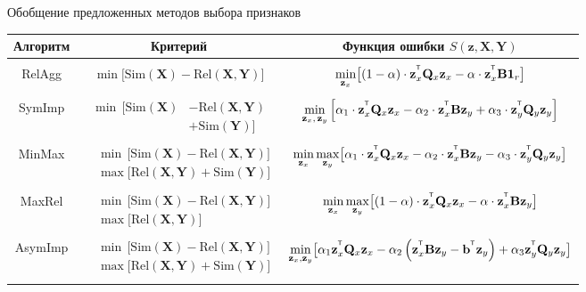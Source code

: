 \documentclass[10pt]{beamer}
\newcommand{\bb}{\mathbf{b}}
\newcommand{\bz}{\mathbf{z}}
\newcommand{\bB}{\mathbf{B}}
\newcommand{\bQ}{\mathbf{Q}}
\newcommand{\bX}{\mathbf{X}}
\newcommand{\bY}{\mathbf{Y}}
\newcommand{\T}{^{\text{\tiny\sffamily\upshape\mdseries T}}}
\newcommand{\bOne}{\boldsymbol{1}}
\begin{document}
\begin{frame}{Обобщение предложенных методов выбора признаков}
\vspace{-0.3cm}
\begin{table}
	\centering
	\footnotesize{
		\begin{tabular}{c|c|c}
			\hline
			Алгоритм & Критерий & Функция ошибки $S(\bz, \bX, \bY)$ \\
			\hline && \\ 
			RelAgg & $\min \bigl[ \text{Sim}(\bX) - \text{Rel}(\bX, \bY) \bigr] $ & $\min\limits_{\bz_x} \bigl[ (1 - \alpha) \cdot \bz_x^{\T} \bQ_x \bz_x - \alpha \cdot \bz_x^{\T} \bB \bOne_r \bigr] $ \\ &&\\
			SymImp & $\begin{aligned} \min \, \bigl[ \text{Sim}(\bX) & - \text{Rel}(\bX, \bY) \\ & + \text{Sim}(\bY) \bigr] \end{aligned}$ & $ \min\limits_{\bz_x, \, \bz_y} \left[ \alpha_1 \cdot \bz_x^{\T} \bQ_x \bz_x - \alpha_2 \cdot \bz_x^{\T} \bB \bz_y + \alpha_3 \cdot \bz_y^{\T} \bQ_y \bz_y \right] $\\ &&\\ 
			MinMax & $\begin{aligned} &\min \, \bigl[ \text{Sim}(\bX) - \text{Rel}(\bX, \bY) \bigr]  \\ & \max \bigl[\text{Rel}(\bX, \bY) + \text{Sim}(\bY) \bigr] \end{aligned}$ & $	\min\limits_{\bz_x} 	\max\limits_{\bz_y} \bigl[\alpha_1 \cdot \bz_x^{\T} \bQ_x \bz_x - \alpha_2 \cdot \bz_x^{\T} \bB \bz_y - \alpha_3 \cdot \bz_y^{\T} \bQ_y \bz_y \bigr]$ \\ &&\\ 
			MaxRel & $\begin{aligned} &\min \, \bigl[ \text{Sim}(\bX) - \text{Rel}(\bX, \bY) \bigr]  \\ & \max \bigl[\text{Rel}(\bX, \bY) \bigr] \end{aligned}$& $\min\limits_{\bz_x} 	\max\limits_{\bz_y} \bigl[ (1 - \alpha) \cdot \bz_x^{\T} \bQ_x \bz_x - \alpha \cdot \bz_x^{\T} \bB \bz_y \bigr]$ \\ 		&&\\
			AsymImp & $\begin{aligned} & \min \, \bigl[ \text{Sim}(\bX) - \text{Rel}(\bX, \bY) \bigr]\\ &  \max \bigl[\text{Rel}(\bX, \bY) + \text{Sim}(\bY) \bigr] \end{aligned}$ & $\min\limits_{\bz_x, \bz_y} \bigl[ \alpha_1 \bz_x^{\T} \bQ_x \bz_x - \alpha_2 \left(\bz_x^{\T} \bB \bz_y - \bb^{\T} \bz_y \right) + \alpha_3  \bz_y^{\T} \bQ_y \bz_y \bigr]$\\  && \\

\end{tabular}}
\end{table}
\end{frame}
\end{document}
